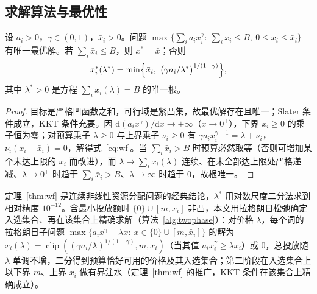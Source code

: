 \subsection{求解算法与最优性}
\label{sec:q3alg}
\begin{theorem}[松弛问题的注水解]\label{thm:wf}
设 $a_i>0$，$\gamma\in(0,1)$，$\bar x_i>0$。问题 $\max\{\sum_i a_i x_i^{\gamma}:\ \sum_i x_i\le B,\ 0\le x_i\le\bar x_i\}$ 有唯一最优解。若 $\sum_i\bar x_i\le B$，则 $x^{*}=\bar x$；否则
\begin{equation}\label{eq:wf}
x^{*}_i(\lambda^{*})=\min\Bigl\{\bar x_i,\ \bigl(\gamma a_i/\lambda^{*}\bigr)^{1/(1-\gamma)}\Bigr\},
\end{equation}
其中 $\lambda^{*}>0$ 是方程 $\sum_i x_i(\lambda)=B$ 的唯一根。
\end{theorem}
\begin{proof}
目标是严格凹函数之和，可行域是紧凸集，故最优解存在且唯一；Slater 条件成立，KKT 条件充要\cite{boyd2004,bertsekas1999}。因 $\mathrm d(a_ix^{\gamma})/\mathrm dx\to+\infty$（$x\to0^{+}$），下界 $x_i\ge0$ 的乘子恒为零；对预算乘子 $\lambda\ge0$ 与上界乘子 $\nu_i\ge0$ 有 $\gamma a_i x_i^{\gamma-1}=\lambda+\nu_i$，$\nu_i(x_i-\bar x_i)=0$，解得式~\eqref{eq:wf}。当 $\sum_i\bar x_i>B$ 时预算必然取等（否则可增加某个未达上限的 $x_i$ 而改进），而 $\lambda\mapsto\sum_i x_i(\lambda)$ 连续、在未全部达上限处严格递减、$\lambda\to0^{+}$ 时趋于 $\sum_i\bar x_i>B$、$\lambda\to\infty$ 时趋于 0，故根唯一。
\end{proof}
定理~\ref{thm:wf} 是连续非线性资源分配问题的经典结论\cite{patriksson2008}，$\lambda^{*}$ 用对数尺度二分法求到相对精度 $10^{-12}$。含最小投放额时 $\{0\}\cup[m,\bar x_i]$ 非凸，本文用拉格朗日松弛确定入选集合、再在该集合上精确求解（算法~\ref{alg:twophase}）：对价格 $\lambda$，每个词的拉格朗日子问题 $\max\{a_i x^{\gamma}-\lambda x:\ x\in\{0\}\cup[m,\bar x_i]\}$ 的解为 $x_i(\lambda)=\operatorname{clip}((\gamma a_i/\lambda)^{1/(1-\gamma)},m,\bar x_i)$（当其值 $a_ix_i^{\gamma}\ge\lambda x_i$）或 0，总投放随 $\lambda$ 单调不增，二分得到预算恰好可用的价格及其入选集合；第二阶段在入选集合上以下界 $m$、上界 $\bar x_i$ 做有界注水（定理~\ref{thm:wf} 的推广，KKT 条件在该集合上精确成立）。


